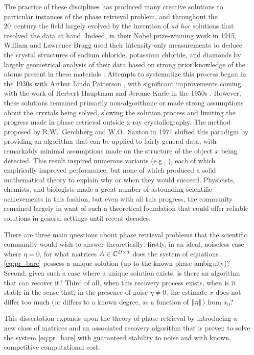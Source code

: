   The practice of these disciplines has produced many creative solutions to particular instances of the phase retrieval problem, and throughout the 20\th\ century the field largely evolved by the invention of \emph{ad hoc} solutions that resolved the data at hand.  Indeed, in their Nobel prize-winning work in 1915, William and Lawrence Bragg used their intensity-only measurements to deduce the crystal structures of sodium chloride, potassium chloride, and diamonds by largely geometrical analysis of their data based on strong prior knowledge of the atoms present in these materials \cite[pp.~88-92, 102-105]{bragg1915crystal_structure}.  Attempts to systematize this process began in the 1930s with Arthur Lindo Patterson \cite{patterson1934fourier_method}, with significant improvements coming with the work of Herbert Hauptman and Jerome Karle in the 1950s \cite{hauptman1953monograph}.  However, these solutions remained primarily non-algorithmic or made strong assumptions about the crystals being solved, slowing the solution process and limiting the progress made in phase retrieval outside x-ray crystallography.  The method proposed by R.W.~Gerchberg and W.O.~Saxton in 1971 \cite{gerchberg1972practical} shifted this paradigm by providing an algorithm that can be applied to fairly general data, with remarkably minimal assumptions made on the structure of the object $x$ being detected.  This result inspired numerous variants (e.g., \cite{bauschke2003hybrid, elser2003phase, fienup1978reconstruction}), each of which empirically improved performance, but none of which produced a solid mathematical theory to explain why or when they would succeed.  Physicists, chemists, and biologists made a great number of astounding scientific achievements in this fashion, but even with all this progress, the community remained largely in want of such a theoretical foundation that could offer reliable solutions in general settings until recent decades.

  
  There are three main questions about phase retrieval problems that the scientific community would wish to answer theoretically: firstly, in an ideal, noiseless case where $\eta = 0$, for what matrices $A \in \mathbb{C}^{D \times d}$ does the system of equations \eqref{eq:pr_bare} possess a unique solution (up to the known phase ambiguity)?  Second, given such a case where a unique solution exists, is there an algorithm that can recover it?  Third of all, when this recovery process exists, when is it stable in the sense that, in the presence of noise $\eta \neq 0$, the estimate $x$ does not differ too much (or differs to a known degree, as a function of $\lVert\eta\rVert$) from $x_0$?

This dissertation expands upon the theory of phase retrieval by introducing a new class of matrices and an associated recovery algorithm that is proven to solve the system \eqref{eq:pr_bare} with guaranteed stability to noise and with known, competitive computational cost.
